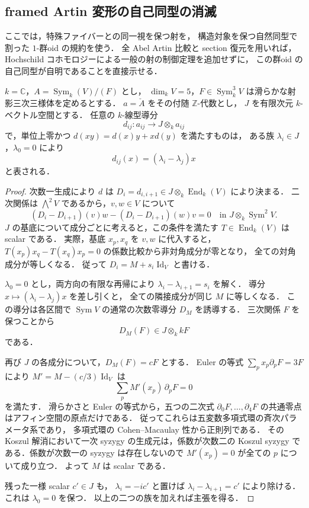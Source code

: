 \subsection{framed Artin 変形の自己同型の消滅}

ここでは，特殊ファイバーとの同一視を保つ射を，
構造対象を保つ自然同型で割った $1$-群oid の規約を使う．
全 Abel Artin 比較と section 復元を用いれば，
Hochschild コホモロジーによる一般の射の制御定理を追加せずに，
この群oid の自己同型が自明であることを直接示せる．

\begin{lemma}
\label{lem:abel-cubic-section-derivations}
$k=\mathbb C$，$A=\operatorname{Sym}_k(V)/(F)$ とし，
$\dim_kV=5$，$F\in\operatorname{Sym}^3_kV$ は滑らかな射影三次三様体を定めるとする．
$a=\check A$ をその付随 $\mathbb Z$-代数とし，
$J$ を有限次元 $k$-ベクトル空間とする．
任意の $k$-線型導分
\[
 d_{ij}:a_{ij}\longrightarrow J\otimes_k a_{ij}
\]
で，単位上零かつ $d(xy)=d(x)y+xd(y)$ を満たすものは，
ある族 $\lambda_i\in J$，$\lambda_0=0$ により
\[
 d_{ij}(x)=(\lambda_i-\lambda_j)x
\]
と表される．
\end{lemma}
\begin{proof}
次数一生成により $d$ は
$D_i=d_{i,i+1}\in J\otimes_k\operatorname{End}_k(V)$ により決まる．
二次関係は $\bigwedge^2V$ であるから，$v,w\in V$ について
\[
 (D_i-D_{i+1})(v)w-(D_i-D_{i+1})(w)v=0
 \quad\text{in }J\otimes_k\operatorname{Sym}^2V.
\]
$J$ の基底について成分ごとに考えると，この条件を満たす
$T\in\operatorname{End}_k(V)$ は scalar である．
実際，基底 $x_p,x_q$ を $v,w$ に代入すると，
$T(x_p)x_q-T(x_q)x_p=0$ の係数比較から非対角成分が零となり，
全ての対角成分が等しくなる．
従って $D_i=M+s_i\operatorname{Id}_V$ と書ける．

$\lambda_0=0$ とし，両方向の有限な再帰により
$\lambda_i-\lambda_{i+1}=s_i$ を解く．
導分 $x\mapsto(\lambda_i-\lambda_j)x$ を差し引くと，
全ての隣接成分が同じ $M$ に等しくなる．
この導分は各区間で $\operatorname{Sym}V$ の通常の次数零導分 $D_M$ を誘導する．
三次関係 $F$ を保つことから
\[
 D_M(F)\in J\otimes_k kF
\]
である．

再び $J$ の各成分について，$D_M(F)=cF$ とする．
Euler の等式 $\sum_px_p\partial_pF=3F$ により
$M'=M-(c/3)\operatorname{Id}_V$ は
\[
 \sum_p M'(x_p)\,\partial_pF=0
\]
を満たす．
滑らかさと Euler の等式から，五つの二次式
$\partial_0F,\ldots,\partial_4F$ の共通零点はアフィン空間の原点だけである．
従ってこれらは五変数多項式環の斉次パラメータ系であり，
多項式環の Cohen--Macaulay 性から正則列である．
その Koszul 解消において一次 syzygy の生成元は，係数が次数二の
Koszul syzygy である．係数が次数一の syzygy は存在しないので
$M'(x_p)=0$ が全ての $p$ について成り立つ．
よって $M$ は scalar である．

残った一様 scalar $c'\in J$ も，
$\lambda_i=-ic'$ と置けば
$\lambda_i-\lambda_{i+1}=c'$ により除ける．
これは $\lambda_0=0$ を保つ．
以上の二つの族を加えれば主張を得る．
\end{proof}

